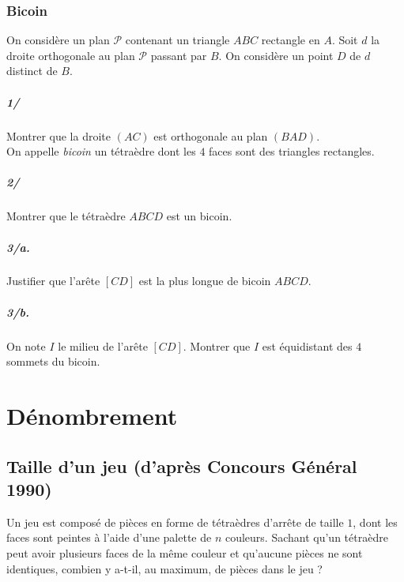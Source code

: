 		\subsection{Bicoin}
		
			On considère un plan $\mathcal{P}$ contenant un triangle $ABC$ rectangle en $A$. Soit $d$ la droite orthogonale au plan $\mathcal{P}$ passant par $B$. On considère un point $D$ de $d$ distinct de $B$.
			
			\paragraph{1/}
				
				Montrer que la droite $(AC)$ est orthogonale au plan $(BAD)$. \\
				
			On appelle \emph{bicoin} un tétraèdre dont les $4$ faces sont des triangles rectangles.
			
			\paragraph{2/}
			
				Montrer que le tétraèdre $ABCD$ est un bicoin.
				
			\paragraph{3/a.} 
			
				Justifier que l'arête $[CD]$ est la plus longue de bicoin $ABCD$.
				
			\paragraph{3/b.}
			
				On note $I$ le milieu de l'arête $[CD]$. Montrer que $I$ est équidistant des $4$ sommets du bicoin.


\chapter{Dénombrement}

	\section{Taille d'un jeu (d'après Concours Général 1990)}

		Un jeu est composé de pièces en forme de tétraèdres d'arrête de taille $1$, dont les faces sont peintes à l'aide d'une palette de $n$ couleurs.
		Sachant qu'un tétraèdre peut avoir plusieurs faces de la même couleur et qu'aucune pièces ne sont identiques, combien y a-t-il, au maximum, de pièces dans le jeu ?
		

